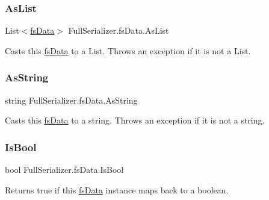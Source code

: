 \subsubsection{\texorpdfstring{As\+List}{AsList}}
{\footnotesize\ttfamily List$<$\hyperlink{class_full_serializer_1_1fs_data}{fs\+Data}$>$ Full\+Serializer.\+fs\+Data.\+As\+List\hspace{0.3cm}{\ttfamily [get]}}



Casts this \hyperlink{class_full_serializer_1_1fs_data}{fs\+Data} to a List. Throws an exception if it is not a List. 

\mbox{\label{class_full_serializer_1_1fs_data_a69c34ee326b025ae8781eb7029943444}} 
\subsubsection{\texorpdfstring{As\+String}{AsString}}
{\footnotesize\ttfamily string Full\+Serializer.\+fs\+Data.\+As\+String\hspace{0.3cm}{\ttfamily [get]}}



Casts this \hyperlink{class_full_serializer_1_1fs_data}{fs\+Data} to a string. Throws an exception if it is not a string. 

\mbox{\label{class_full_serializer_1_1fs_data_a0150291174c11e0880aee949b14c8741}} 
\subsubsection{\texorpdfstring{Is\+Bool}{IsBool}}
{\footnotesize\ttfamily bool Full\+Serializer.\+fs\+Data.\+Is\+Bool\hspace{0.3cm}{\ttfamily [get]}}



Returns true if this \hyperlink{class_full_serializer_1_1fs_data}{fs\+Data} instance maps back to a boolean. 

\mbox{\label{class_full_serializer_1_1fs_data_a493e25ed3252e4a381a1cd47b9a1559e}} 
